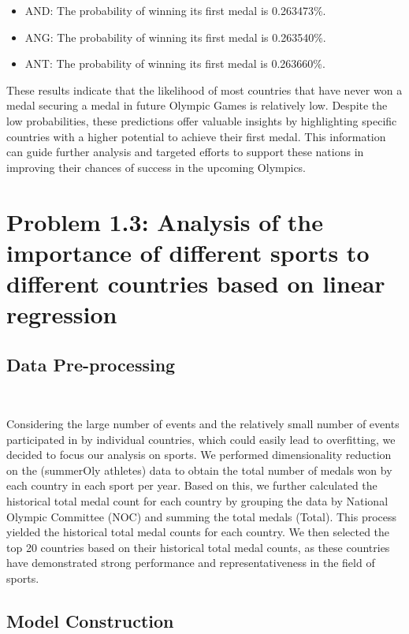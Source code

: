 \documentclass[12pt]{article}
\begin{document}
\begin{itemize}
    \item AND: The probability of winning its first medal is 0.263473\%.
    \item ANG: The probability of winning its first medal is 0.263540\%.
    \item ANT: The probability of winning its first medal is 0.263660\%.
\end{itemize}

These results indicate that the likelihood of most countries that have never won a medal securing a medal in future Olympic Games is relatively low. Despite the low probabilities, these predictions offer valuable insights by highlighting specific countries with a higher potential to achieve their first medal. This information can guide further analysis and targeted efforts to support these nations in improving their chances of success in the upcoming Olympics.

\section{Problem 1.3: Analysis of the importance of different sports to different countries based on linear regression}

\subsection{Data Pre-processing} \

Considering the large number of events and the relatively small number of events participated in by individual countries, which could easily lead to overfitting, we decided to focus our analysis on sports. We performed dimensionality reduction on the (summerOly athletes) data to obtain the total number of medals won by each country in each sport per year. Based on this, we further calculated the historical total medal count for each country by grouping the data by National Olympic Committee (NOC) and summing the total medals (Total). This process yielded the historical total medal counts for each country. We then selected the top 20 countries based on their historical total medal counts, as these countries have demonstrated strong performance and representativeness in the field of sports.

\subsection{Model Construction} \
\end{document}
